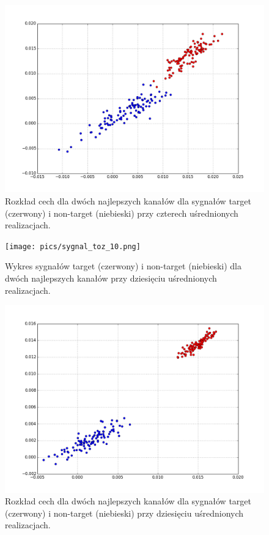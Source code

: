\documentclass[licencjacka,openright]{pracamgr}
\begin{document}
\begin{figure}[H]
\centering
\includegraphics[scale=0.55, trim=0mm 0mm 0mm 0mm, clip=True]{pics/cecha_toz_4.png}
\caption{Rozkład cech dla dwóch najlepszych kanałów dla sygnałów target (czerwony) i non-target (niebieski) przy czterech uśrednionych realizacjach.}
\label{cecha_toz_4}
\end{figure}

\begin{figure}[H]
\centering
\texttt{[image: pics/sygnal\_toz\_10.png]}
\caption{Wykres sygnałów target (czerwony) i non-target (niebieski) dla dwóch najlepszych kanałów przy dziesięciu uśrednionych realizacjach.}
\label{sygnal_toz_10}
\end{figure}

\begin{figure}[H]
\centering
\includegraphics[scale=0.55, trim=0mm 0mm 0mm 0mm, clip=True]{pics/cecha_toz_10.png}
\caption{Rozkład cech dla dwóch najlepszych kanałów dla sygnałów target (czerwony) i non-target (niebieski) przy dziesięciu uśrednionych realizacjach.}
\label{cecha_toz_10}
\end{figure}
\end{document}
